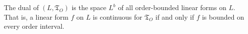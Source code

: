 The dual of $(L, \mathfrak{T}_O)$ is the space $L^b$ of all order-bounded linear forms on $L$. That is, a linear form $f$ on $L$ is continuous for $\mathfrak{T}_O$ if and only if $f$ is bounded on every order interval.
